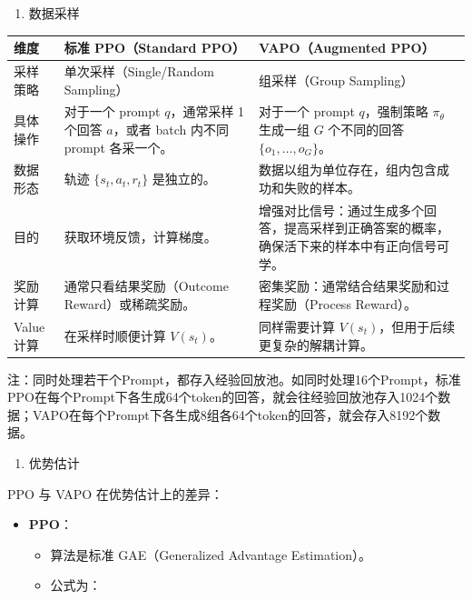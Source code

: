 \begin{enumerate}
\def\labelenumi{\arabic{enumi}.}
\setcounter{enumi}{1}
\tightlist
\item
  数据采样
\end{enumerate}

\begin{longtable}[]{@{}
  >{\raggedright\arraybackslash}p{}
  >{\raggedright\arraybackslash}p{}
  >{\raggedright\arraybackslash}p{}@{}}
\toprule
维度 & 标准 PPO（Standard PPO） & VAPO（Augmented PPO） \\
\midrule
\endhead
采样策略 & 单次采样（Single/Random Sampling） & 组采样（Group Sampling） \\
具体操作 & 对于一个 prompt \(q\)，通常采样 1 个回答 \(a\)，或者 batch 内不同 prompt 各采一个。 & 对于一个 prompt \(q\)，强制策略 \(\pi_\theta\) 生成一组 \(G\) 个不同的回答 \(\{o_1,\ldots,o_G\}\)。 \\
数据形态 & 轨迹 \(\{s_t,a_t,r_t\}\) 是独立的。 & 数据以组为单位存在，组内包含成功和失败的样本。 \\
目的 & 获取环境反馈，计算梯度。 & 增强对比信号：通过生成多个回答，提高采样到正确答案的概率，确保活下来的样本中有正向信号可学。 \\
奖励计算 & 通常只看结果奖励（Outcome Reward）或稀疏奖励。 & 密集奖励：通常结合结果奖励和过程奖励（Process Reward）。 \\
Value 计算 & 在采样时顺便计算 \(V(s_t)\)。 & 同样需要计算 \(V(s_t)\)，但用于后续更复杂的解耦计算。 \\
\bottomrule
\end{longtable}

注：同时处理若干个Prompt，都存入经验回放池。如同时处理16个Prompt，标准PPO在每个Prompt下各生成64个token的回答，就会往经验回放池存入1024个数据；VAPO在每个Prompt下各生成8组各64个token的回答，就会存入8192个数据。

\begin{enumerate}
\def\labelenumi{\arabic{enumi}.}
\setcounter{enumi}{2}
\tightlist
\item
  优势估计
\end{enumerate}

PPO 与 VAPO 在优势估计上的差异：

\begin{itemize}
\tightlist
\item
  \textbf{PPO}：

  \begin{itemize}
  \tightlist
  \item
    算法是标准 GAE（Generalized Advantage Estimation）。
  \item
    公式为：
  \end{itemize}
\end{itemize}

